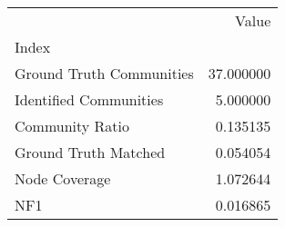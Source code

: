 \begin{tabular}{lr}
\toprule
{} &      Value \\
Index                    &            \\
\midrule
Ground Truth Communities &  37.000000 \\
Identified Communities   &   5.000000 \\
Community Ratio          &   0.135135 \\
Ground Truth Matched     &   0.054054 \\
Node Coverage            &   1.072644 \\
NF1                      &   0.016865 \\
\bottomrule
\end{tabular}

